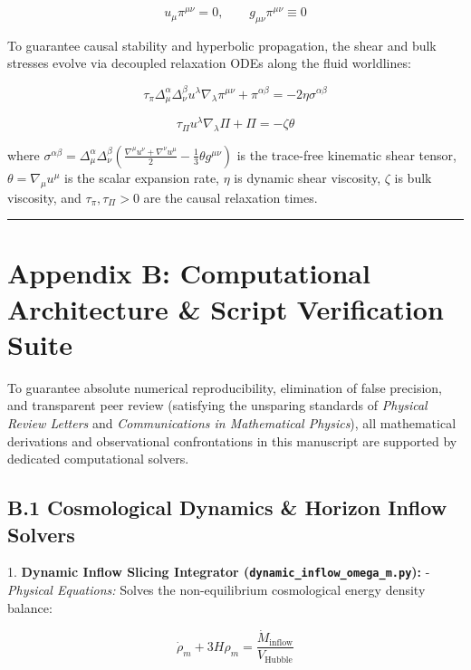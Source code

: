 \documentclass[11pt,a4paper]{article}
\theoremstyle{definition}\newtheorem{definition}{Definition}
\theoremstyle{remark}\newtheorem{remark}{Remark}
\begin{document}
\begin{equation}
u_\mu \pi^{\mu\nu} = 0, \qquad g_{\mu\nu} \pi^{\mu\nu} \equiv 0
\end{equation}


To guarantee causal stability and hyperbolic propagation, the shear and bulk stresses evolve via decoupled relaxation ODEs along the fluid worldlines:


\begin{equation}
\tau_\pi \Delta^\alpha_\mu \Delta^\beta_\nu u^\lambda \nabla_\lambda \pi^{\mu\nu} + \pi^{\alpha\beta} = -2\eta \sigma^{\alpha\beta}
\end{equation}



\begin{equation}
\tau_\Pi u^\lambda \nabla_\lambda \Pi + \Pi = -\zeta \theta
\end{equation}


where $\sigma^{\alpha\beta} = \Delta^\alpha_\mu \Delta^\beta_\nu \left( \frac{\nabla^\mu u^\nu + \nabla^\nu u^\mu}{2} - \frac{1}{3} \theta g^{\mu\nu} \right)$ is the trace-free kinematic shear tensor, $\theta = \nabla_\mu u^\mu$ is the scalar expansion rate, $\eta$ is dynamic shear viscosity, $\zeta$ is bulk viscosity, and $\tau_\pi, \tau_\Pi > 0$ are the causal relaxation times.

\noindent\rule{\linewidth}{0.4pt}
\section{Appendix B: Computational Architecture \& Script Verification Suite}

To guarantee absolute numerical reproducibility, elimination of false precision, and transparent peer review (satisfying the unsparing standards of \textit{Physical Review Letters} and \textit{Communications in Mathematical Physics}), all mathematical derivations and observational confrontations in this manuscript are supported by dedicated computational solvers.
\subsection{B.1 Cosmological Dynamics \& Horizon Inflow Solvers}

1. \textbf{Dynamic Inflow Slicing Integrator (\texttt{dynamic_inflow_omega_m.py}):}
- \textit{Physical Equations:} Solves the non-equilibrium cosmological energy density balance:


\begin{equation}
\dot{\rho}_m + 3H\rho_m = \frac{\dot{M}_{\text{inflow}}}{V_{\text{Hubble}}}
\end{equation}
\end{document}
